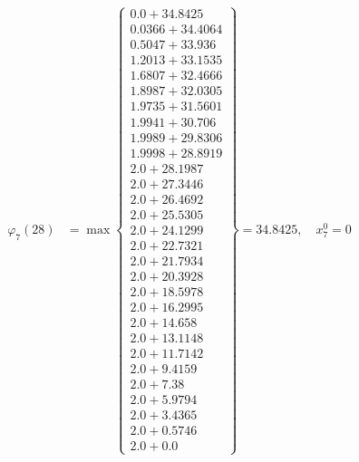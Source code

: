 \documentclass{article}
\begin{document}
\begin{align*}
  
\varphi_{7}(28) &= \max \left\{ \begin{array}{c}
0.0 + 34.8425 \\
 0.0366 + 34.4064 \\
 0.5047 + 33.936 \\
 1.2013 + 33.1535 \\
 1.6807 + 32.4666 \\
 1.8987 + 32.0305 \\
 1.9735 + 31.5601 \\
 1.9941 + 30.706 \\
 1.9989 + 29.8306 \\
 1.9998 + 28.8919 \\
 2.0 + 28.1987 \\
 2.0 + 27.3446 \\
 2.0 + 26.4692 \\
 2.0 + 25.5305 \\
 2.0 + 24.1299 \\
 2.0 + 22.7321 \\
 2.0 + 21.7934 \\
 2.0 + 20.3928 \\
 2.0 + 18.5978 \\
 2.0 + 16.2995 \\
 2.0 + 14.658 \\
 2.0 + 13.1148 \\
 2.0 + 11.7142 \\
 2.0 + 9.4159 \\
 2.0 + 7.38 \\
 2.0 + 5.9794 \\
 2.0 + 3.4365 \\
 2.0 + 0.5746 \\
 2.0 + 0.0
\end{array} \right\}=34.8425,\quad x_{7}^0=0\\
  
  
  

\end{align*}
\end{document}
